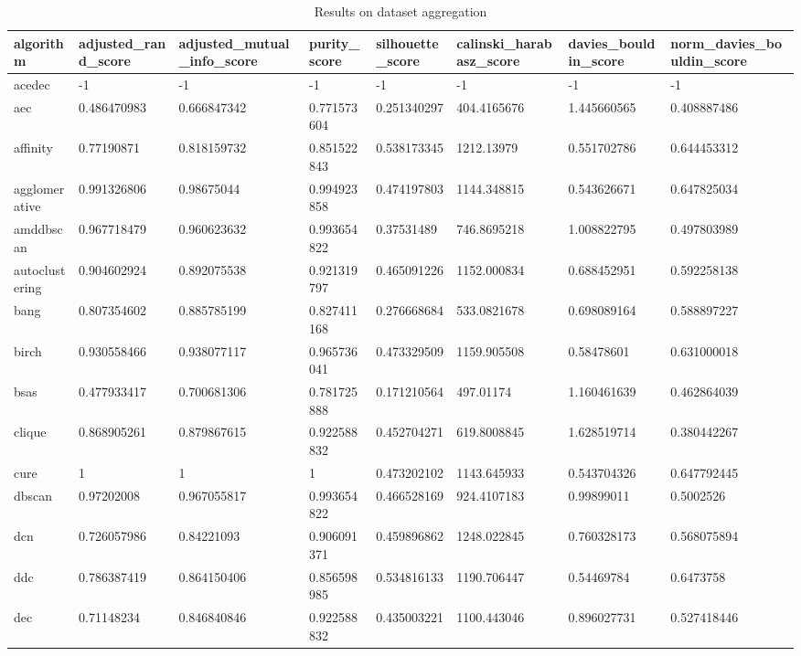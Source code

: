 \begin{table}[H]
\centering
\caption{Results on dataset aggregation}
\label{tab:params:aggregation}
\begin{tabular}{|l|l|l|l|l|l|l|l|}
\hline
algorithm & adjusted\_rand\_score & adjusted\_mutual\_info\_score & purity\_score & silhouette\_score & calinski\_harabasz\_score & davies\_bouldin\_score & norm\_davies\_bouldin\_score \\
\hline
acedec & -1 & -1 & -1 & -1 & -1 & -1 & -1 \\
\hline
aec & 0.486470983 & 0.666847342 & 0.771573604 & 0.251340297 & 404.4165676 & 1.445660565 & 0.408887486 \\
\hline
affinity & 0.77190871 & 0.818159732 & 0.851522843 & 0.538173345 & 1212.13979 & 0.551702786 & 0.644453312 \\
\hline
agglomerative & 0.991326806 & 0.98675044 & 0.994923858 & 0.474197803 & 1144.348815 & 0.543626671 & 0.647825034 \\
\hline
amddbscan & 0.967718479 & 0.960623632 & 0.993654822 & 0.37531489 & 746.8695218 & 1.008822795 & 0.497803989 \\
\hline
autoclustering & 0.904602924 & 0.892075538 & 0.921319797 & 0.465091226 & 1152.000834 & 0.688452951 & 0.592258138 \\
\hline
bang & 0.807354602 & 0.885785199 & 0.827411168 & 0.276668684 & 533.0821678 & 0.698089164 & 0.588897227 \\
\hline
birch & 0.930558466 & 0.938077117 & 0.965736041 & 0.473329509 & 1159.905508 & 0.58478601 & 0.631000018 \\
\hline
bsas & 0.477933417 & 0.700681306 & 0.781725888 & 0.171210564 & 497.01174 & 1.160461639 & 0.462864039 \\
\hline
clique & 0.868905261 & 0.879867615 & 0.922588832 & 0.452704271 & 619.8008845 & 1.628519714 & 0.380442267 \\
\hline
cure & 1 & 1 & 1 & 0.473202102 & 1143.645933 & 0.543704326 & 0.647792445 \\
\hline
dbscan & 0.97202008 & 0.967055817 & 0.993654822 & 0.466528169 & 924.4107183 & 0.99899011 & 0.5002526 \\
\hline
dcn & 0.726057986 & 0.84221093 & 0.906091371 & 0.459896862 & 1248.022845 & 0.760328173 & 0.568075894 \\
\hline
ddc & 0.786387419 & 0.864150406 & 0.856598985 & 0.534816133 & 1190.706447 & 0.54469784 & 0.6473758 \\
\hline
dec & 0.71148234 & 0.846840846 & 0.922588832 & 0.435003221 & 1100.443046 & 0.896027731 & 0.527418446 \\

\end{tabular}
\end{table}
